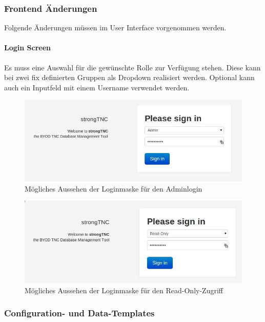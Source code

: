 \subsubsection{Frontend Änderungen}
Folgende Änderungen müssen im User Interface vorgenommen werden.

\paragraph*{Login Screen}

Es muss eine Auswahl für die gewünschte Rolle zur Verfügung stehen. Diese kann bei zwei fix 
definierten Gruppen als Dropdown realisiert werden. Optional kann auch ein Inputfeld mit einem 
Username verwendet werden. 

\begin{figure}[H]
	\centering
	\includegraphics[width=\textwidth]{images/rollen-konzept/login-admin.jpg}
	\caption{Mögliches Aussehen der Loginmaske für den Adminlogin}
\end{figure}

\begin{figure}[H]
	\centering
	\includegraphics[width=\textwidth]{images/rollen-konzept/login-read-only.jpg}
	\caption{Mögliches Aussehen der Loginmaske für den Read-Only-Zugriff}
\end{figure}

\subsubsection{Configuration- und Data-Templates}

